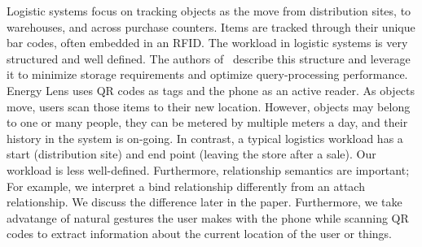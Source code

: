Logistic systems focus on tracking objects as the move from distribution sites, to warehouses, and across purchase counters.  
Items are tracked through their unique bar codes, often embedded in an RFID.  The workload in logistic systems is very structured 
and well defined.  The authors of~\cite{rfid_gonz2006} describe this structure and leverage it to minimize storage
requirements and optimize query-processing performance.  Energy Lens uses QR codes as tags and the phone as an active
reader.  As objects move, users scan those items to their new location.  However, objects may belong to one or
many people, they can be metered by multiple meters a day, and their history in the system
is on-going.  In contrast, a typical logistics workload has a start (distribution site) and end point (leaving the store
after a sale).  Our workload is less well-defined.  Furthermore, relationship semantics are important; 
For example, we interpret a bind relationship differently from an attach relationship.  We discuss the difference
later in the paper.
Furthermore, we take advatange of natural gestures the user makes with the phone while scanning QR codes to extract
information about the current location of the user or things.


